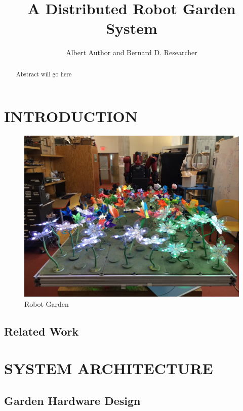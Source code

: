 \documentclass[letterpaper, 10 pt, conference]{ieeeconf}  %
\title{\LARGE \bf
A Distributed Robot Garden System
}
\author{Albert Author and Bernard D. Researcher%
}
\begin{document}
\maketitle
\thispagestyle{empty}
\pagestyle{empty}


\begin{abstract}

Abstract will go here

\end{abstract}


\section{INTRODUCTION}

\begin{figure}[thpb]
	\centering
	\includegraphics[scale=0.07]{photo_4.png}
	\caption{Robot Garden}
	\label{fig: garden}
	
\end{figure}

\subsection{\textbf{Related Work}}


\section{SYSTEM ARCHITECTURE}
\subsection{\textbf{Garden Hardware Design}}
\end{document}
